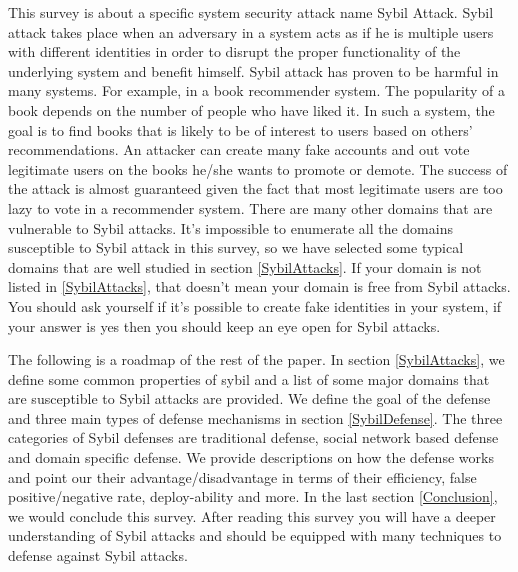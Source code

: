 \documentclass[conference]{IEEEtran}
\begin{document}
This survey is about a specific system security attack name Sybil Attack. Sybil attack takes place when an adversary in a system acts as if he is multiple users
with different identities in order to disrupt the proper functionality of the underlying system and benefit himself. Sybil attack has proven to be harmful in many systems. 
For example, in a book recommender system.
The popularity of a book depends on the number of people who have liked it. In such a system, the goal is to find books that is likely to be of interest to users based on others'
recommendations. An attacker can create many fake accounts and out vote legitimate users on the books he/she wants to promote or demote. The success of the attack is almost guaranteed given
the fact that most legitimate users are too lazy to vote in a recommender system. 
There are many other domains that are vulnerable to Sybil attacks. It's impossible to enumerate all the domains susceptible to Sybil attack in 
this survey, so we have selected some typical domains that are well studied in section \ref{SybilAttacks}. If your domain is not listed in \ref{SybilAttacks}, 
that doesn't mean your domain is free from Sybil attacks. You should ask yourself if it's possible to create fake identities in your system, if your answer is yes then you should
keep an eye open for Sybil attacks.

The following is a roadmap of the rest of the paper.
In section \ref{SybilAttacks}, we define some common properties of sybil and a list of some major domains that are susceptible to Sybil attacks are provided.
We define the goal of the defense and three main types of defense mechanisms in section \ref{SybilDefense}. 
The three categories of Sybil defenses are traditional defense, social
network based defense and domain specific defense. We provide descriptions on how the defense works and point our their advantage/disadvantage
in terms of their efficiency, false positive/negative rate, deploy-ability and more. In the last section \ref{Conclusion}, we would conclude this survey.
After reading this survey you will have a deeper understanding of Sybil attacks and should be equipped with many techniques to defense against Sybil attacks.





\end{document}
